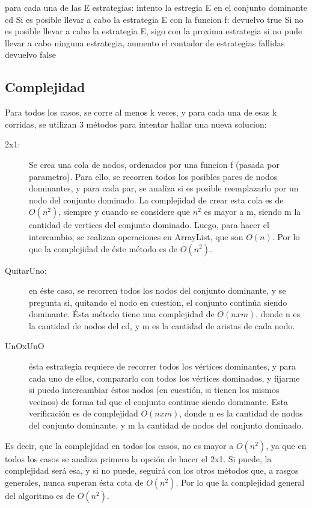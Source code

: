 \begin{codebox}
\li	para cada una de las E estrategias: \Do
\li		intento la estregia E en el conjunto dominante cd
\li		Si es posible llevar a cabo la estrategia E con la funcion f: \Do
\li			devuelvo true
\End
\li		Si no es posible llevar a cabo la estrategia E, sigo con la proxima estrategia
\End
\li si no pude llevar a cabo ninguna estrategia, aumento el contador de estrategias fallidas
\li devuelvo false
\end{codebox}

\subsection{Complejidad}
Para todos los casos, se corre al menos k veces, y para cada una de esas k corridas, se utilizan 3 métodos para intentar hallar una nueva solucion:
\begin{description}
\item[2x1:] Se crea una cola de nodos, ordenados por una funcion f (pasada por parametro). Para ello, se recorren todos los posibles pares de nodos dominantes, y para cada par, se analiza si es posible reemplazarlo por un nodo del conjunto dominado. La complejidad de crear esta cola es de $O(n^2)$, siempre y cuando se considere que $n^2$ es mayor a m, siendo m la cantidad de vertices del conjunto dominado. Luego, para hacer el intercambio, se realizan operaciones en ArrayList, que son $O(n)$. Por lo que la complejidad de éste método es de $O(n^2)$.
\item[QuitarUno:] en éste caso, se recorren todos los nodos del conjunto dominante, y se pregunta si, quitando el nodo en cuestion, el conjunto continúa siendo dominante. Ésta método tiene una complejidad de $O(n x m)$, donde n es la cantidad de nodos del cd, y m es la cantidad de aristas de cada nodo.
 \item[UnOxUnO] ésta estrategia requiere de recorrer todos los vértices dominantes, y para cada uno de ellos, compararlo con todos los vértices dominados, y fijarme si puedo intercambiar éstos nodos (en cuestión, si tienen los mismos vecinos) de forma tal que el conjunto continue siendo dominante. Esta verificación es de complejidad $O(n x m)$, donde n es la cantidad de nodos del conjunto dominante, y m la cantidad de nodos del conjunto dominado.
\end{description}
 
 Es decir, que la complejidad en todos los casos, no es mayor a $O(n^2)$, ya que en todos los casos se analiza primero la opción de hacer el 2x1. Si puede, la complejidad será esa, y si no puede, seguirá con los otros métodos que, a rasgos generales, nunca superan ésta cota de $O(n^2)$. Por lo que la complejidad general del algoritmo es de \textbf{$O(n^2)$}.
 
